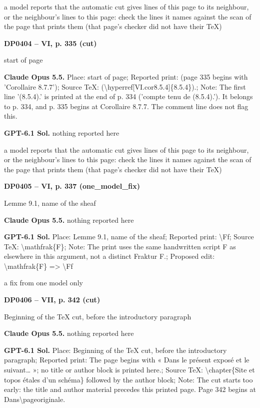 a model reports that the automatic cut gives lines of this page to its neighbour, or the neighbour's lines to this page: check the lines it names against the scan of the page that prints them (that page's checker did not have their TeX)\par
\par\noindent\hypertarget{DP0404}{}\textbf{DP0404 -- VI, p. 335 (cut)}\par
start of page\par
\textbf{Claude Opus 5.5.} Place: start of page; Reported print: (page 335 begins with 'Corollaire 8.7.7'); Source TeX: (\textbackslash{}hyperref[VI.cor8.5.4]\{8.5.4\}).; Note: The first line '(8.5.4).' is printed at the end of p. 334 ('compte tenu de (8.5.4).'). It belongs to p. 334, and p. 335 begins at Corollaire 8.7.7. The comment line does not flag this.\par
\textbf{GPT-6.1 Sol.} nothing reported here\par
a model reports that the automatic cut gives lines of this page to its neighbour, or the neighbour's lines to this page: check the lines it names against the scan of the page that prints them (that page's checker did not have their TeX)\par
\par\noindent\hypertarget{DP0405}{}\textbf{DP0405 -- VI, p. 337 (one\_model\_fix)}\par
Lemme 9.1, name of the sheaf\par
\textbf{Claude Opus 5.5.} nothing reported here\par
\textbf{GPT-6.1 Sol.} Place: Lemme 9.1, name of the sheaf; Reported print: \textbackslash{}Ff; Source TeX: \textbackslash{}mathfrak\{F\}; Note: The print uses the same handwritten script F as elsewhere in this argument, not a distinct Fraktur F.; Proposed edit: \textbackslash{}mathfrak\{F\} =\allowbreak > \textbackslash{}Ff\par
a fix from one model only\par
\par\noindent\hypertarget{DP0406}{}\textbf{DP0406 -- VII, p. 342 (cut)}\par
Beginning of the TeX cut, before the introductory paragraph\par
\textbf{Claude Opus 5.5.} nothing reported here\par
\textbf{GPT-6.1 Sol.} Place: Beginning of the TeX cut, before the introductory paragraph; Reported print: The page begins with « Dans le présent exposé et le suivant… »; no title or author block is printed here.; Source TeX: \textbackslash{}chapter\{Site et topos étales d'un schéma\} followed by the author block; Note: The cut starts too early: the title and author material precedes this printed page. Page 342 begins at Dans\textbackslash{}pageoriginale.\par
